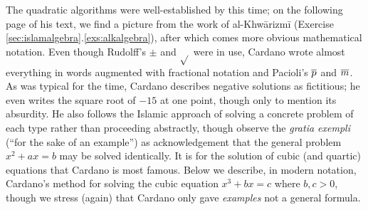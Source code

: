 \begin{minipage}[t]{0.65\linewidth}\vspace{0pt}
	The quadratic algorithms were well-established by this time; on the following page of his text, we find a picture from the work of al-Khwārizmī (Exercise \ref*{sec:islamalgebra}.\ref{exs:alkalgebra}), after which comes more obvious mathematical notation. Even though Rudolff's $\pm$ and $\sqrt{}$ were in use, Cardano wrote almost everything in words augmented with fractional notation and Pacioli's $\overline{p}$ and $\overline{m}$.\smallbreak
	As was typical for the time, Cardano describes negative solutions as fictitious; he even writes the square root of $-15$ at one point, though only to mention its absurdity. He also follows the Islamic approach of solving a concrete problem of each type rather than proceeding abstractly, though observe the \emph{gratia exempli} (``for the sake of an example'') as acknowledgement that the general problem $x^2+ax=b$ may be solved identically.\medbreak
	It is for the solution of cubic (and quartic) equations that Cardano is most famous. Below we describe, in modern notation, Cardano's method for solving the cubic equation $x^3+bx=c$ where $b,c>0$, though we stress (again) that Cardano only gave \emph{examples} not a general formula.
\end{minipage}
\hfill
